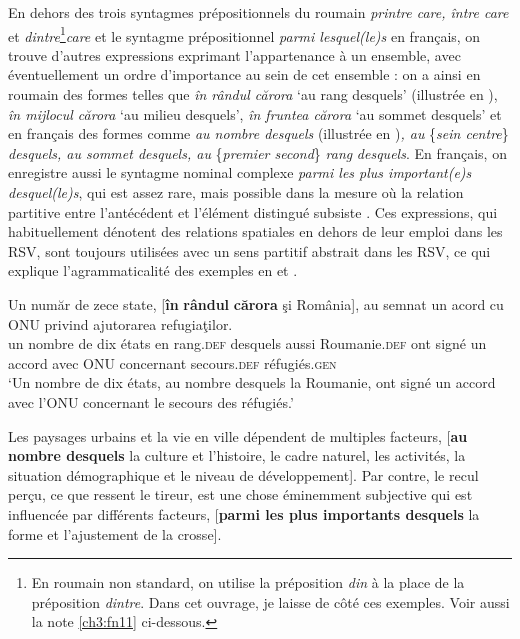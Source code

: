 En dehors des trois syntagmes prépositionnels du roumain\textit{ printre care, între care} et \textit{dintre}\footnote{En roumain non standard, on utilise la préposition \textit{din} à la place de la préposition \textit{dintre}. Dans cet ouvrage, je laisse de côté ces exemples. Voir aussi la note \ref{ch3:fn11} ci-dessous.}\textit{care} et le syntagme prépositionnel \textit{parmi lesquel(le)s} en français, on trouve d’autres expressions exprimant l’appartenance à un ensemble, avec éventuellement un ordre d’importance au sein de cet ensemble : on a ainsi en roumain des formes telles que \textit{în rândul cărora} ‘au rang desquels’ (illustrée en ), \textit{în mij\-locul cărora} ‘au milieu desquels’, \textit{în fruntea cărora} ‘au sommet desquels’ et en français des formes comme \textit{au nombre desquels} (illustrée en )\textit{, au} \{\textit{sein {\textbar} centre}\}\textit{ desquels, au sommet desquels, au} \{\textit{premier {\textbar} second}\} \textit{rang} \textit{desquels}. En français, on enregistre aussi le syntagme nominal complexe\textit{ parmi les plus important(e)s desquel(le)s}, qui est assez rare, mais possible dans la mesure où la relation partitive entre l’antécédent et l’élément distingué subsiste . Ces expressions, qui habituellement dénotent des relations spatiales en dehors de leur emploi dans les RSV, sont toujours utilisées avec un sens partitif abstrait dans les RSV, ce qui explique l’agrammaticalité des exemples en  et .  

\ea \label{ch3:ex12}
\gll Un  număr  de  zece  state,  [\textbf{în} \textbf{rândul} \textbf{cărora} şi  România],  au  semnat un  acord  cu  ONU  privind  ajutorarea  refugiaţilor.\\
un  nombre  de  dix  états  en  rang.\textsc{def}  desquels  aussi  Roumanie.\textsc{def}  ont  signé un  accord  avec  ONU  concernant  secours.\textsc{def}  réfugiés.\textsc{gen} \\
\glt ‘Un nombre de dix états, au nombre desquels la Roumanie, ont signé un accord avec l’ONU concernant le secours des réfugiés.’ 
\z

\ea \label{ch3:ex13}
\ea
Les paysages urbains et la vie en ville dépendent de multiples facteurs, [\textbf{au nombre desquels} la culture et l’histoire, le cadre naturel, les activités, la situation démographique et le niveau de développement]. \label{ch3:ex13a}
\ex
Par contre, le recul perçu, ce que ressent le tireur, est une chose éminemment subjective qui est influencée par différents facteurs, [\textbf{parmi les plus importants desquels} la forme et l’ajustement de la crosse]. \label{ch3:ex13b}
\z
\z

